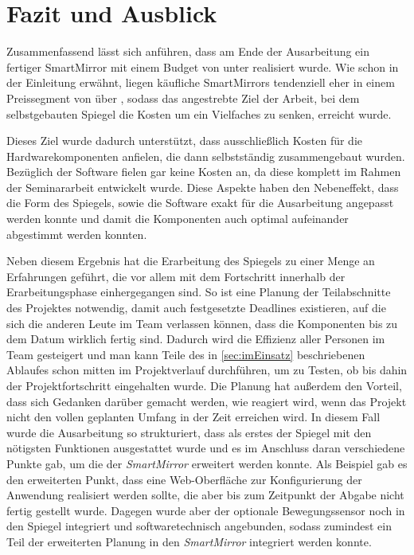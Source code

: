 \section{Fazit und Ausblick}

Zusammenfassend lässt sich anführen, dass am Ende der Ausarbeitung ein fertiger SmartMirror mit einem Budget von unter  realisiert wurde. 
Wie schon in der Einleitung erwähnt, liegen käufliche SmartMirrors tendenziell eher in einem Preissegment von über , sodass das angestrebte Ziel der Arbeit, bei dem selbstgebauten Spiegel die Kosten um ein Vielfaches zu senken, erreicht wurde.

Dieses Ziel wurde dadurch unterstützt, dass ausschließlich Kosten für die Hardwarekomponenten anfielen, die dann selbstständig zusammengebaut wurden. Bezüglich der Software fielen gar keine Kosten an, da diese komplett im Rahmen der Seminararbeit entwickelt wurde.
Diese Aspekte haben den Nebeneffekt, dass die Form des Spiegels, sowie die Software exakt für die Ausarbeitung angepasst werden konnte und damit die Komponenten auch optimal aufeinander abgestimmt werden konnten.

Neben diesem Ergebnis hat die Erarbeitung des Spiegels zu einer Menge an Erfahrungen geführt, die vor allem mit dem Fortschritt innerhalb der Erarbeitungsphase einhergegangen sind.
So ist eine Planung der Teilabschnitte des Projektes notwendig, damit auch festgesetzte Deadlines existieren, auf die sich die anderen Leute im Team verlassen können, dass die Komponenten bis zu dem Datum wirklich fertig sind. Dadurch wird die Effizienz aller Personen im Team gesteigert und man kann Teile des in \autoref{sec:imEinsatz} beschriebenen Ablaufes schon mitten im Projektverlauf durchführen, um zu Testen, ob bis dahin der Projektfortschritt eingehalten wurde. 
Die Planung hat außerdem den Vorteil, dass sich  Gedanken darüber gemacht werden, wie reagiert wird, wenn das Projekt nicht den vollen geplanten Umfang in der Zeit erreichen wird. In diesem Fall wurde die Ausarbeitung so strukturiert, dass als erstes der Spiegel mit den nötigsten Funktionen ausgestattet wurde und es im Anschluss daran verschiedene Punkte gab, um die der \textit{SmartMirror} erweitert werden konnte. Als Beispiel gab es den erweiterten Punkt, dass eine Web-Oberfläche zur Konfigurierung der Anwendung realisiert werden sollte, die aber bis zum Zeitpunkt der Abgabe nicht fertig gestellt wurde. Dagegen wurde aber der optionale Bewegungssensor noch in den Spiegel integriert und softwaretechnisch angebunden, sodass zumindest ein Teil der erweiterten Planung in den \textit{SmartMirror} integriert werden konnte.

